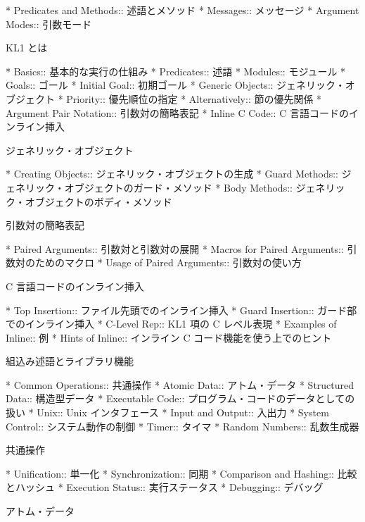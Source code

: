 * Predicates and Methods::      述語とメソッド
* Messages::                    メッセージ
* Argument Modes::              引数モード

KL1 とは

* Basics::                      基本的な実行の仕組み
* Predicates::                  述語
* Modules::                     モジュール
* Goals::                       ゴール
* Initial Goal::                初期ゴール
* Generic Objects::             ジェネリック・オブジェクト
* Priority::                    優先順位の指定
* Alternatively::               節の優先関係
* Argument Pair Notation::      引数対の簡略表記
* Inline C Code::               C 言語コードのインライン挿入

ジェネリック・オブジェクト

* Creating Objects::            ジェネリック・オブジェクトの生成
* Guard Methods::               ジェネリック・オブジェクトのガード・メソッド
* Body Methods::                ジェネリック・オブジェクトのボディ・メソッド

引数対の簡略表記

* Paired Arguments::            引数対と引数対の展開
* Macros for Paired Arguments:: 引数対のためのマクロ 
* Usage of Paired Arguments::   引数対の使い方

C 言語コードのインライン挿入

* Top Insertion::               ファイル先頭でのインライン挿入
* Guard Insertion::             ガード部でのインライン挿入
* C-Level Rep::                 KL1 項の C レベル表現
* Examples of Inline::          例
* Hints of Inline::             インライン C コード機能を使う上でのヒント

組込み述語とライブラリ機能

* Common Operations::           共通操作
* Atomic Data::                 アトム・データ
* Structured Data::             構造型データ
* Executable Code::             プログラム・コードのデータとしての扱い
* Unix::                        Unix インタフェース
* Input and Output::            入出力
* System Control::              システム動作の制御
* Timer::                       タイマ
* Random Numbers::              乱数生成器

共通操作

* Unification::                 単一化
* Synchronization::             同期
* Comparison and Hashing::      比較とハッシュ
* Execution Status::            実行ステータス
* Debugging::                   デバッグ

アトム・データ

